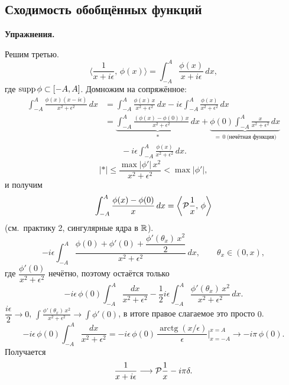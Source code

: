 \documentclass[12pt,a4paper]{article}
\begin{document}
\subsection{Сходимость обобщённых функций}





\noindent\textbf{Упражнения.}




Решим третью.
\[
\biggl\langle
    \frac{1}{x+i\epsilon},\,
    \phi(x)
\biggr\rangle
=
\int_{-A}^{A}\frac{\phi(x)}{x+i\epsilon}\,dx,
\]
где \(\operatorname{supp}\phi\subset[-A,A]\). Домножим на сопряжённое:
\begin{align*}
\int_{-A}^{A}\frac{\phi(x)(x-i\epsilon)}{x^2+\epsilon^2}\,dx
&=
\int_{-A}^{A}\frac{\phi(x)\,x}{x^2+\epsilon^2}\,dx
-
i\epsilon\int_{-A}^{A}\frac{\phi(x)}{x^2+\epsilon^2}\,dx \\
&=
\underbrace{
    \int_{-A}^{A}
        \frac{(\phi(x)-\phi(0))\,x}{x^2+\epsilon^2}\,dx
}_{*}
+
\underbrace{
    \phi(0)\int_{-A}^{A}\frac{x}{x^2+\epsilon^2}\,dx
}_{=\,0\ \text{(нечётная функция)}} \\
&\qquad
-
i\epsilon\int_{-A}^{A}\frac{\phi(x)}{x^2+\epsilon^2}\,dx.
\end{align*}
\[
|*|
\le
\frac{\max|\phi'|\, x^2}{x^2+\epsilon^2}
<
\max|\phi'|,
\]
и получим
\[
\int_{-A}^{A}\frac{\phi(x)-\phi(0)}{x}\,dx
=
\biggl\langle
    \mathcal{P}\frac{1}{x},\,
    \phi
\biggr\rangle
\]
(см.\ практику 2, сингулярные ядра в \(\mathbb{R}\)).
\[
-i\epsilon\int_{-A}^{A}
\frac{
    \phi(0)+\phi'(0)+\dfrac{\phi'(\theta_x)\,x^2}{2}
}{x^2+\epsilon^2}\,dx,
\qquad
\theta_x\in(0,x),
\]
где \(\dfrac{\phi'(0)}{x^2+\epsilon^2}\) нечётно, поэтому остаётся только
\[
-i\epsilon\,\phi(0)\int_{-A}^{A}\frac{dx}{x^2+\epsilon^2}
-
\frac12 i\epsilon
\int_{-A}^{A}
    \frac{\phi'(\theta_x)\,x^2}{x^2+\epsilon^2}\,dx.
\]
\(\dfrac{i\epsilon}{2}\to 0\),
\(\displaystyle\int\frac{\phi'(\theta_x)\,x^2}{x^2+\epsilon^2}
\to\int\phi'(0)\),
в итоге правое слагаемое это просто \(0\).
\[
-i\epsilon\,\phi(0)\int_{-A}^{A}\frac{dx}{x^2+\epsilon^2}
=
-i\epsilon\,\phi(0)\,
\frac{\operatorname{arctg}(x/\epsilon)}{\epsilon}
\Big|_{x=-A}^{x=A}
\longrightarrow
-i\pi\,\phi(0).
\]
Получается
\[
\frac{1}{x+i\epsilon}
\longrightarrow
\mathcal{P}\frac{1}{x}-i\pi\delta.
\]
\end{document}
